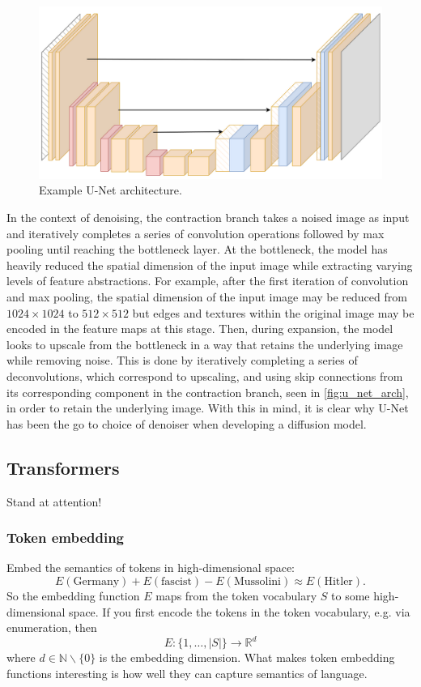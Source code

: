 \documentclass[11pt]{article}
\begin{document}
\begin{figure}[ht]
    \centering
    \includegraphics[width=\columnwidth]{./figures/generative_models/unet.png}
    \caption{\centering Example U-Net architecture.}
    \label{fig:u_net_arch}
\end{figure}

\noindent In the context of denoising, the contraction branch takes a noised image as input and iteratively completes a series of convolution operations followed by max pooling until reaching the bottleneck layer. At the bottleneck, the model has heavily reduced the spatial dimension of the input image while extracting varying levels of feature abstractions. For example, after the first iteration of convolution and max pooling, the spatial dimension of the input image may be reduced from $1024\times1024$ to $512\times512$ but edges and textures within the original image may be encoded in the feature maps at this stage. Then, during expansion, the model looks to upscale from the bottleneck in a way that retains the underlying image while removing noise. This is done by iteratively completing a series of deconvolutions, which correspond to upscaling, and using skip connections from its corresponding component in the contraction branch, seen in \autoref{fig:u_net_arch}, in order to retain the underlying image. With this in mind, it is clear why U-Net has been the go to choice of denoiser when developing a diffusion model.

\subsection{Transformers}
Stand at attention!

\subsubsection{Token embedding}
Embed the semantics of tokens in high-dimensional space:
$$
E(\text{Germany})
+E(\text{fascist})
-E(\text{Mussolini})
\approx
E(\text{Hitler}).
$$
So the embedding function $E$ maps from the token vocabulary $S$ to some high-dimensional space. If you first encode the tokens in the token vocabulary, e.g. via enumeration, then
$$
E:\{1,\dots,|S|\}\to\mathbb{R}^d
$$
where $d\in\mathbb{N}\backslash\{0\}$ is the embedding dimension. What makes token embedding functions interesting is how well they can capture semantics of language.
\end{document}
